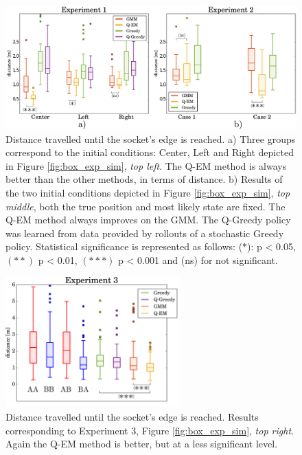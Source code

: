 \begin{figure}
 \centering
  \includegraphics[width=\textwidth]{./ch4-PiH/Figures/Fig/experiment_1_2.pdf}
  \caption{Distance travelled until the socket's edge is reached. a) Three groups correspond to the initial conditions: Center, Left and Right
   depicted in Figure \ref{fig:box_exp_sim}, \textit{top left}. The Q-EM method is always better than the other methods, in terms of distance. b)
   Results of the two initial conditions depicted in Figure \ref{fig:box_exp_sim}, \textit{top middle}, both the true position and most likely state are
   fixed. The Q-EM method always improves on the GMM. The Q-Greedy policy was learned from data provided by rollouts of a stochastic Greedy policy. Statistical significance is 
   represented as follows: ($\ast$): p < 0.05, $(\ast\ast)$ p < 0.01, $(\ast\ast\ast)$ p < 0.001 and (ns) for not significant.}
   \label{fig:three_searches}
\end{figure}
\begin{figure}
 \centering
  \includegraphics[width=0.6\textwidth]{./ch4-PiH/Figures/Fig/experiment3_plot2.pdf}
  \caption{Distance travelled until the socket's edge is reached. Results corresponding to Experiment 3, Figure \ref{fig:box_exp_sim}, \textit{top right}.
   Again the Q-EM method is better, but at a less significant level.}
   \label{fig:three_searches_exp3}
\end{figure}
 

